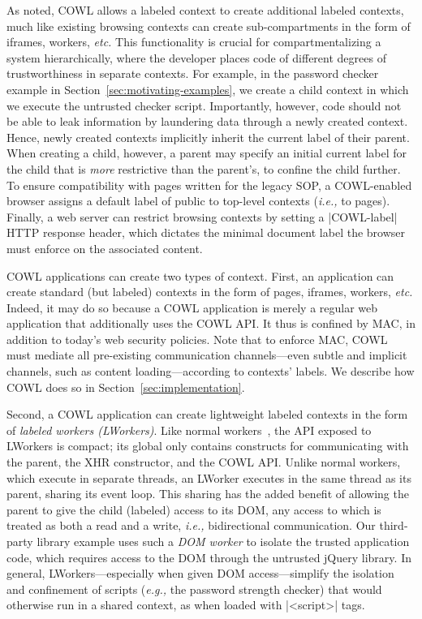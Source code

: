 As noted, COWL allows a labeled context to create additional labeled contexts,
much like existing browsing contexts can create sub-compartments
in the form of iframes, workers, \emph{etc.}
%
This functionality is crucial for compartmentalizing a system
hierarchically, where the developer places code of different degrees
of trustworthiness in separate contexts.
%
For example, in the password checker example in
Section~\ref{sec:motivating-examples}, we create a child context in
which we execute the untrusted checker script.
%
Importantly, however, code should not be able to leak information by
laundering data through a newly created context.
%
Hence, newly created contexts implicitly inherit the current label of
their parent.
%
When creating a child, however, a parent may specify an initial
current label for the child that is {\em more} restrictive than the
parent's, to confine the child further.
%
To ensure compatibility with pages written for the legacy SOP, a
COWL-enabled browser assigns a default label of public to top-level
contexts (\emph{i.e.,} to pages).
%
Finally, a web server can restrict browsing contexts by setting a
\js|COWL-label| HTTP response header, which dictates the minimal
document label the browser must enforce on the associated content.

COWL applications can create two types of context.
%
First, an application can create standard (but labeled) contexts in
the form of pages, iframes, workers, \emph{etc.}
%
Indeed, it may do so because a COWL application is merely a regular
web application that additionally uses the COWL API. It thus is
confined by MAC, in addition to today's web security policies.
%
Note that to enforce MAC, COWL must mediate all pre-existing
communication channels---even subtle and implicit channels, such as
content loading---according to contexts' labels.
%
We describe how COWL does so in Section~\ref{sec:implementation}.

Second, a COWL application can create lightweight labeled contexts in
the form of \emph{labeled workers (LWorkers)}.
%
Like normal workers~\cite{workers}, the API exposed to LWorkers is
compact; its global only contains constructs for communicating with
the parent, the XHR constructor, and the COWL API.
%
Unlike normal workers, which execute in separate threads, an LWorker
executes in the same thread as its parent, sharing its event loop.
%
This sharing has the added benefit of allowing the parent to give the
child (labeled) access to its DOM, any access to which is treated as
both a read and a write, \emph{i.e.,} bidirectional communication.
%
Our third-party library example uses such a \emph{DOM worker} to
isolate the trusted application code, which requires access to the DOM
through the untrusted jQuery library.
%
In general, LWorkers---especially when given DOM access---simplify the
isolation and confinement of scripts (\emph{e.g.,} the password strength
checker) that would otherwise run in a shared context, as when loaded
with \js|<script>| tags.

